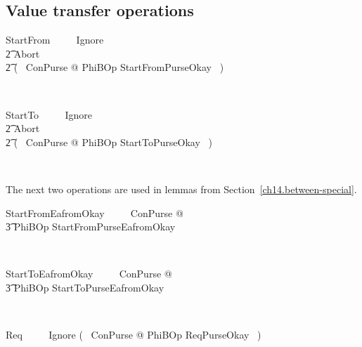\subsection{Value transfer operations}\label{ch5.promoted.valuetransfer}

\begin{LSDef}
\begin{zed}
  StartFrom ~~~~ Ignore
  \\ \t2                \lor Abort
  \\ \t2                \lor (~ \exists \Delta ConPurse @
  PhiBOp \land StartFromPurseOkay ~)
\end{zed}~\end{LSDef}

\begin{LSDef}
\begin{zed}
  StartTo ~~~~ Ignore
  \\ \t2                \lor Abort
  \\ \t2                \lor (~ \exists \Delta ConPurse @
  PhiBOp \land StartToPurseOkay ~)
\end{zed}~\end{LSDef}

The next two operations are used in lemmas from Section~\ref{ch14.between-special}.
%
\begin{LSDef}
\begin{zed}
  StartFromEafromOkay ~~~~ \exists \Delta ConPurse @
  \\ \t3                        PhiBOp \land StartFromPurseEafromOkay
\end{zed}~\end{LSDef}

\begin{LSDef}
\begin{zed}
  StartToEafromOkay ~~~~ \exists \Delta ConPurse @
  \\ \t3                        PhiBOp \land StartToPurseEafromOkay
\end{zed}~\end{LSDef}

\begin{LSDef}
\begin{zed}
  Req ~~~~ Ignore \lor (~ \exists \Delta ConPurse @
  PhiBOp \land ReqPurseOkay ~)
\end{zed}~\end{LSDef}

